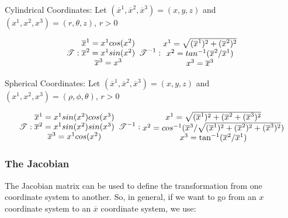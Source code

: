 \documentclass{article}
\begin{document}
Cylindrical Coordinates: Let $( \overline{ x }^1, \overline{ x }^2, \overline{ x }^3 ) = ( x, y, z )$ and $( x^1, x^2, x^3 ) = ( r, \theta, z )$, $r > 0$

\begin{equation}
	\mathscr{ T } :
	\begin{matrix}
	\overline{ x }^1 = x^1 cos( x^2 )\\
	\overline{ x }^2 = x^1 sin( x^2 )\\
	\overline{ x }^3 = x^3
	\end{matrix}\\
	\mathscr{ T }^{-1} :
	\begin{matrix}
	x^1 = \sqrt{ ( \overline{ x }^1 )^2 + ( \overline{ x }^2 )^2 }\\
	x^2 = tan^{-1}( \overline{ x }^2 / \overline{ x }^1 )\\
	x^3 = \overline{ x }^3
	\end{matrix}
\end{equation}


Spherical Coordinates: Let $( \overline{ x }^1, \overline{ x }^2, \overline{ x }^3 ) = ( x, y, z )$ and $( x^1, x^2, x^3 ) = ( \rho, \phi, \theta )$, $r > 0$

\begin{equation}
	\mathscr{ T } :
	\begin{matrix}
	\overline{ x }^1 = x^1 sin( x^2 ) cos( x^3 )\\
	\overline{ x }^2 = x^1 sin( x^2 ) sin( x^3 )\\
	\overline{ x }^3 = x^1 cos( x^2 )
	\end{matrix}\\
	\mathscr{ T }^{-1} :
	\begin{matrix}
	x^1 = \sqrt{ ( \overline{ x }^1 )^2 + ( \overline{ x }^2 + ( \overline{ x }^3 )^2 }\\
	x^2 = cos^{-1}( \overline{ x }^3 / \sqrt{ ( \overline{ x }^1 )^2 + ( \overline{ x }^2 )^2 + ( \overline{ x }^3 )^2 } )\\
	x^3 = \tan^{-1}( \overline{ x }^2 / \overline{ x }^1 )
	\end{matrix}
\end{equation}

\subsubsection{The Jacobian}

The Jacobian matrix can be used to define the transformation from one coordinate system to another.  So, in general, if we want to go from an $x$ coordinate system to an $\overline{ x }$ coordinate system, we use:
\end{document}
